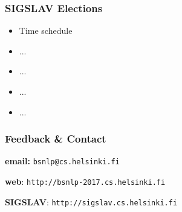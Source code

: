 \documentclass{beamer}
\begin{document}
\begin{frame}[fragile]
 \frametitle{SIGSLAV Elections}
 
\begin{itemize}

\item Time schedule

\vspace{0.2cm}

\item ...

\vspace{0.2cm}

\item ...

\vspace{0.2cm}

\item ...

\vspace{0.2cm}

\item ...

\end{itemize}

\end{frame}



\begin{frame}[fragile]
 \frametitle{Feedback \& Contact}

\textbf{email:} {\color{blue} \large{\verb+bsnlp@cs.helsinki.fi+}}

\vspace{1cm}

\textbf{web}: {\color{blue} \large{\verb+http://bsnlp-2017.cs.helsinki.fi+}}

\vspace{1cm}

\textbf{SIGSLAV}: {\color{blue} \large{\verb+http://sigslav.cs.helsinki.fi+}}


\end{frame}
\end{document}
